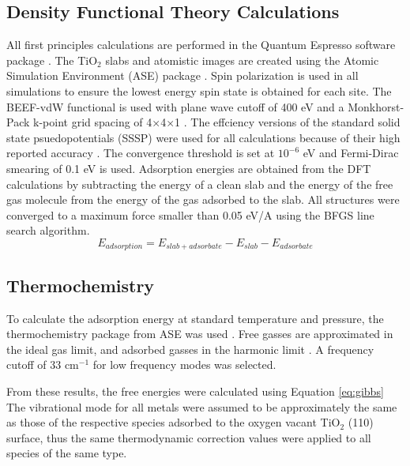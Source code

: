\subsection{Density Functional Theory Calculations}
All first principles calculations are performed in the Quantum Espresso software package \cite{QE-2009}.
The TiO$_2$ slabs and atomistic images are created using the Atomic Simulation Environment (ASE) package \cite{Hjorth_Larsen_2017}.  Spin polarization is used in all simulations to ensure the lowest energy spin state is obtained for each site. The BEEF-vdW functional \cite{Wellendorff_2012} is used with plane wave cutoff of 400 eV and a Monkhorst-Pack k-point grid spacing of 4$\times$4$\times$1 \cite{Monkhorst_1976}. The effciency versions of the standard solid state psuedopotentials \cite{SSSP_pseudos} (SSSP) were used for all calculations because of their high reported accuracy \cite{Lejaeghereaad3000}. The convergence threshold is set at $10^{-6}$ eV and Fermi-Dirac smearing of 0.1 eV is used. Adsorption energies are obtained from the DFT calculations by subtracting the energy of a clean slab and the energy of the free gas molecule from the energy of the gas adsorbed to the slab. All structures were converged to a maximum force smaller than 0.05 eV/A using the BFGS line search algorithm.
\begin{equation}
E_{adsorption} = E_{slab+adsorbate} - E_{slab} - E_{adsorbate}
\end{equation}

\subsection{Thermochemistry}

To calculate the adsorption energy at standard temperature and pressure, the thermochemistry package from ASE was used \cite{ase-paper}. Free gasses are approximated in the ideal gas limit, and adsorbed gasses in the harmonic limit \cite{Reuter_2005}. A frequency cutoff of 33 cm$^{-1}$ for low frequency modes was selected. 

From these results, the free energies were calculated using Equation \ref{eq:gibbs} The vibrational mode for all metals were assumed to be approximately the same as those of the respective species adsorbed to the oxygen vacant TiO$_2$ (110) surface, thus the same thermodynamic correction values were applied to all species of the same type.

